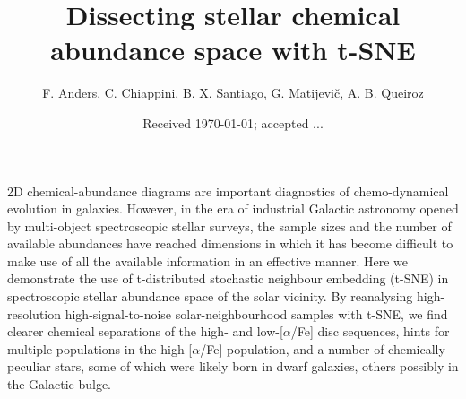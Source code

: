 \documentclass{aa}  %
\begin{document}
 

   \title{Dissecting stellar chemical abundance space with t-SNE}

   \author{F. Anders, C. Chiappini, B. X. Santiago, G. Matijevi\v{c}, A. B. Queiroz%
   }
   
   

   \date{Received \today; accepted ...}

  \abstract
   {2D chemical-abundance diagrams are important diagnostics of chemo-dynamical evolution in galaxies. However, in the era of industrial Galactic astronomy opened by multi-object spectroscopic stellar surveys, the sample sizes and the number of available abundances have reached dimensions in which it has become difficult to make use of all the available information in an effective manner. Here we demonstrate the use of t-distributed stochastic neighbour embedding (t-SNE) in spectroscopic stellar abundance space of the solar vicinity. By reanalysing high-resolution high-signal-to-noise solar-neighbourhood samples with t-SNE, we find clearer chemical separations of the high- and low-[$\alpha$/Fe] disc sequences, hints for multiple populations in the high-[$\alpha$/Fe] population, and a number of chemically peculiar stars, some of which were likely born in dwarf galaxies, others possibly in the Galactic bulge.}

   \maketitle

\end{document}
